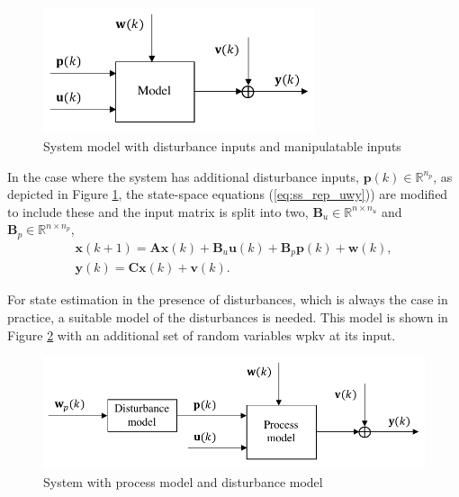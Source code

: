 \begin{figure}[htp]
	\centering
	\includegraphics[width=8cm]{images/model_diag_upwvy.pdf}
	\caption{System model with disturbance inputs and manipulatable inputs}
	\label{fig:model_diag_upwvy}
\end{figure}
In the case where the system has additional disturbance inputs, $\mathbf{p}(k) \in \mathbb{R}^{n_p}$, as depicted in Figure \ref{fig:model_diag_upwvy}, the state-space equations (\ref{eq:ss_rep_uwy})) are modified to include these and the input matrix is split into two, $\mathbf{B}_u \in \mathbb{R}^{n \times n_u}$ and $\mathbf{B}_p \in \mathbb{R}^{n \times n_p}$,
\begin{equation} \label{eq:ss_rep_upwy}
	\begin{aligned}
		\mathbf{x}(k+1) = \mathbf{A} \mathbf{x}(k) + \mathbf{B}_u \mathbf{u}(k) + \mathbf{B}_p \mathbf{p}(k) + \mathbf{w}(k), \\
		\mathbf{y}(k) = \mathbf{C} \mathbf{x}(k) + \mathbf{v}(k).
	\end{aligned}
\end{equation}

For state estimation in the presence of disturbances, which is always the case in practice, a suitable model of the disturbances is needed. This model is shown in Figure \ref{fig:model_diag_wpupwvy} with an additional set of random variables \gls{wpkv} at its input.
\begin{figure}[htp]
	\centering
	\includegraphics[width=12.5cm]{images/model_diag_wpupwvy.pdf}
	\caption{System with process model and disturbance model}
	\label{fig:model_diag_wpupwvy}
\end{figure}

